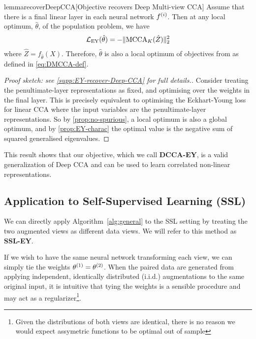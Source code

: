 \begin{restatable}{lemma}{recoverDeepCCA}[Objective recovers Deep Multi-view CCA]\label{lem:recover-DeepCCA}
    Assume that there is a final linear layer in each neural network $f^{(i)}$.
    Then at any local optimum, $\hat{\theta}$, of the population problem, we have
    \begin{align*}
        \mathcal{L}_\text{EY}(\hat{\theta}) = - \lVert\operatorname{MCCA}_K(\hat{Z})\rVert_2^2
    \end{align*}
    where $\hat{Z} = f_{\hat{\theta}}(X)$.
    Therefore, $\hat{\theta}$ is also a local optimum of objectives from \citet{andrew2013deep, somandepalli2019multimodal} as defined in \cref{eq:DMCCA-def}.
\end{restatable}

\begin{proof}[Proof sketch: see \cref{supp:EY-recover-Deep-CCA} for full details.]
    Consider treating the penultimate-layer representations as fixed, and optimising over the weights in the final layer.
    This is precisely equivalent to optimising the Eckhart-Young loss for linear CCA where the input variables are the penultimate-layer representations.
    So by \cref{prop:no-spurious}, a local optimum is also a global optimum, and by \cref{prop:EY-charac} the optimal value is the negative sum of squared generalised eigenvalues.
\end{proof}

This result shows that our objective, which we call \textbf{DCCA-EY}, is a valid generalization of Deep CCA and can be used to learn correlated non-linear representations.

\subsection{Application to Self-Supervised Learning (SSL)}

We can directly apply Algorithm~\ref{alg:general} to the SSL setting by treating the two augmented views as different data views. We will refer to this method as \textbf{SSL-EY}.

If we wish to have the same neural network transforming each view, we can simply tie the weights $\theta^{(1)} = \theta^{(2)}$. When the paired data are generated from applying independent, identically distributed (i.i.d.) augmentations to the same original input, it is intuitive that tying the weights is a sensible procedure and may act as a regularizer\footnote{Given the distributions of both views are identical, there is no reason we would expect assymetric functions to be optimal out of sample}.

